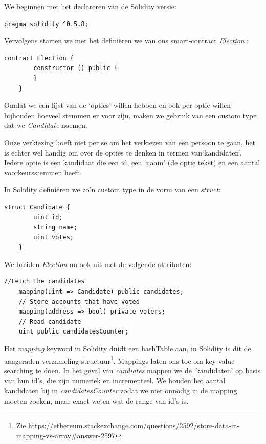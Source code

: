 	We beginnen met het declareren van de Solidity versie:

	\lstset{language=JavaScriptSolidity} 
	\begin{lstlisting}[numbers=none]
	pragma solidity ^0.5.8;
	\end{lstlisting}
	\lstset{language=JavaScriptSolidity} 

	Vervolgens starten we met het definiëren we van ons smart-contract \textit{Election} :
	\begin{lstlisting}[numbers=none]	
	contract Election {
		constructor () public {
		}
	}
	\end{lstlisting}
	
	Omdat we een lijst van de `opties' willen hebben en ook per optie willen bijhouden hoeveel stemmen er voor zijn, maken we gebruik van een custom type dat we \textit{Candidate} noemen. 

	Onze verkiezing hoeft niet per se om het verkiezen van een persoon te gaan, het is echter wel handig om over de opties te denken in termen van`kandidaten'. 
	Iedere optie is een kandidaat die een id, een `naam' (de optie tekst) en een aantal voorkeursstemmen heeft. 
	
	In Solidity definiëren we zo'n custom type in de vorm van een \textit{struct}:
	
	\begin{lstlisting}[numbers=none]	
	struct Candidate {
		uint id;
		string name;
		uint votes;
	}
	\end{lstlisting}
	
	We breiden \textit{Election} nu ook uit met de volgende attributen:
	
	\begin{lstlisting}[numbers=none]
	//Fetch the candidates	
	mapping(uint => Candidate) public candidates;
	// Store accounts that have voted
	mapping(address => bool) private voters;
	// Read candidate
	uint public candidatesCounter;
	\end{lstlisting}
	
	Het \textit{mapping} keyword in Solidity duidt een hashTable aan, in Solidity is dit de aangeraden verzameling-structuur\footnote{Zie https://ethereum.stackexchange.com/questions/2592/store-data-in-mapping-vs-array\#answer-2597}.  Mappings laten ons toe om key-value searching te doen. In het geval van  \textit{candiates} mappen we de `kandidaten' op basis van hun id's, die zijn numeriek en incrementeel. We houden het aantal kandidaten bij in \textit{candidatesCounter} zodat we niet onnodig in de mapping moeten zoeken, maar exact weten wat de range van id's is.
	
